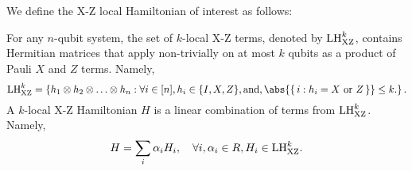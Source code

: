 

We define the X-Z local Hamiltonian of interest as follows:

\begin{dfn} For any $n$-qubit system, the set of $k$-local X-Z terms, denoted by $\mathrm{LH}_{\mathrm{XZ}}^{k}$, contains Hermitian matrices that apply non-trivially on at most $k$ qubits as a product of Pauli $X$ and $Z$ terms. Namely,
\begin{equation}
  \LHXZ{k} = \left\{h_1 \otimes h_2 \otimes \ldots \otimes h_n: \forall i \in [n], h_i \in \{I, X, Z\}, \text{and}, \abs{\set{i: h_i=X \text{ or }Z}} \leq k. \right \}.
\end{equation}
A $k$-local X-Z Hamiltonian $H$ is a linear combination of terms from $\mathrm{LH}_{\mathrm{XZ}}^{k}$. Namely,
\begin{equation}
  H = \sum_i \alpha_{i} H_i,  \quad \forall i, \alpha_i \in R,  H_i \in \mathrm{LH}_{\mathrm{XZ}}^{k}.
\end{equation}
\end{dfn}


